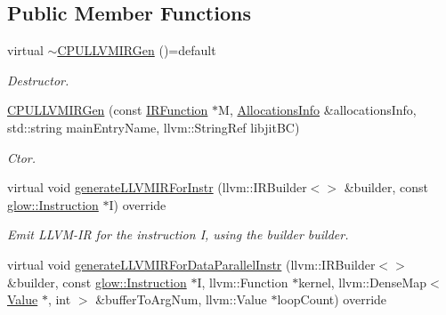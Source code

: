 \subsection*{Public Member Functions}
\begin{DoxyCompactItemize}
\item 
\mbox{\label{classglow_1_1_c_p_u_l_l_v_m_i_r_gen_a531edc97dfea41002c7c1f3f5bb9b48c}} 
virtual \hyperlink{classglow_1_1_c_p_u_l_l_v_m_i_r_gen_a531edc97dfea41002c7c1f3f5bb9b48c}{$\sim$\+C\+P\+U\+L\+L\+V\+M\+I\+R\+Gen} ()=default
\begin{DoxyCompactList}\small\item\em Destructor. \end{DoxyCompactList}\item 
\mbox{\label{classglow_1_1_c_p_u_l_l_v_m_i_r_gen_a0a4ef29d10ca8fb1ed832df7005711a7}} 
\hyperlink{classglow_1_1_c_p_u_l_l_v_m_i_r_gen_a0a4ef29d10ca8fb1ed832df7005711a7}{C\+P\+U\+L\+L\+V\+M\+I\+R\+Gen} (const \hyperlink{classglow_1_1_i_r_function}{I\+R\+Function} $\ast$M, \hyperlink{structglow_1_1_allocations_info}{Allocations\+Info} \&allocations\+Info, std\+::string main\+Entry\+Name, llvm\+::\+String\+Ref libjit\+BC)
\begin{DoxyCompactList}\small\item\em Ctor. \end{DoxyCompactList}\item 
\mbox{\label{classglow_1_1_c_p_u_l_l_v_m_i_r_gen_a396fcac8c5710b807e7fd670c33cd4bb}} 
virtual void \hyperlink{classglow_1_1_c_p_u_l_l_v_m_i_r_gen_a396fcac8c5710b807e7fd670c33cd4bb}{generate\+L\+L\+V\+M\+I\+R\+For\+Instr} (llvm\+::\+I\+R\+Builder$<$$>$ \&builder, const \hyperlink{classglow_1_1_instruction}{glow\+::\+Instruction} $\ast$I) override
\begin{DoxyCompactList}\small\item\em Emit L\+L\+V\+M-\/\+IR for the instruction {\ttfamily I}, using the builder {\ttfamily builder}. \end{DoxyCompactList}\item 
virtual void \hyperlink{classglow_1_1_c_p_u_l_l_v_m_i_r_gen_adbc69b398e182458dc67c93c3357b606}{generate\+L\+L\+V\+M\+I\+R\+For\+Data\+Parallel\+Instr} (llvm\+::\+I\+R\+Builder$<$$>$ \&builder, const \hyperlink{classglow_1_1_instruction}{glow\+::\+Instruction} $\ast$I, llvm\+::\+Function $\ast$kernel, llvm\+::\+Dense\+Map$<$ \hyperlink{classglow_1_1_value}{Value} $\ast$, int $>$ \&buffer\+To\+Arg\+Num, llvm\+::\+Value $\ast$loop\+Count) override

\end{DoxyCompactItemize}

